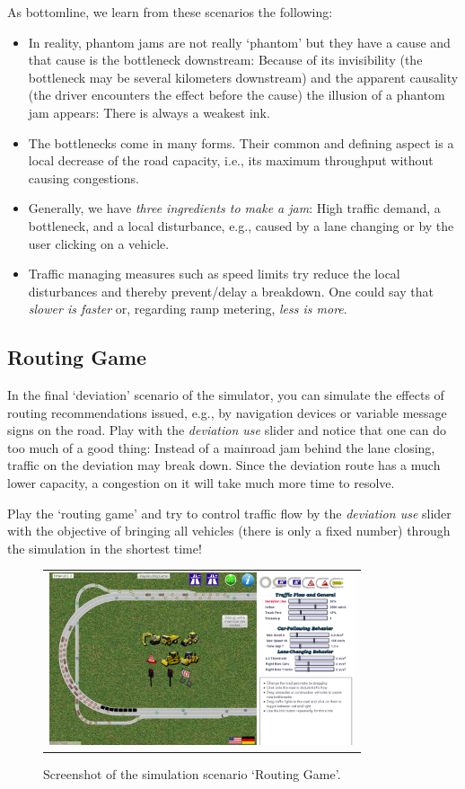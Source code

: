 \documentclass[paper=A4,pagesize=auto,11pt]{scrartcl}
\providecommand{\gquote}[1]{`#1'}
\providecommand{\bi}{\begin{itemize}}
\providecommand{\ei}{\end{itemize}}
\begin{document}
As bottomline, we learn from these scenarios the following:
\bi
\item In reality, phantom jams are not really \gquote{phantom} but they
have a cause and that cause is the bottleneck downstream: Because of
its invisibility (the bottleneck may be several kilometers downstream)
and the apparent causality (the driver encounters the effect before
the cause) the illusion of a phantom jam appears: There is always a
weakest ink.
\item The bottlenecks come in many forms. Their common and defining
  aspect is a local decrease of
the road capacity, i.e., its maximum throughput without causing
congestions.
\item Generally, we have \textit{three ingredients to make a jam}:
  High traffic demand, a bottleneck, and a local disturbance, e.g.,
  caused by a lane changing or by the user clicking on a vehicle.
\item Traffic managing measures such as speed limits try reduce the
  local disturbances and thereby prevent/delay a breakdown. One could
  say that \emph{slower is faster} or, 
  regarding ramp metering, \emph{less is more}. 
\ei


\subsection{Routing Game}\label{sec:routing}
In the final \gquote{deviation} scenario of the simulator, you can simulate
the effects of routing recommendations issued, e.g., by navigation
devices or variable message signs on the road. Play with the
\emph{deviation use} slider and notice that one can do too much of a
good thing: Instead of a mainroad jam behind the lane closing, traffic
on the deviation may break down. Since the deviation route has a much
lower capacity, a congestion on it will take much more time to
resolve.

Play the \gquote{routing game} and try to control traffic flow by the
\emph{deviation use} slider with the objective of bringing all
vehicles (there is only a fixed number) through the simulation in the
shortest time!

\begin{figure}[!th]
\centering
\begin{tabular}{c}
  \includegraphics[width=90mm]{figs/screen_routing.png}
\end{tabular}
 \caption{\label{fig:routingScenario}Screenshot of the simulation scenario \gquote{Routing Game}.}
\end{figure}
\end{document}
